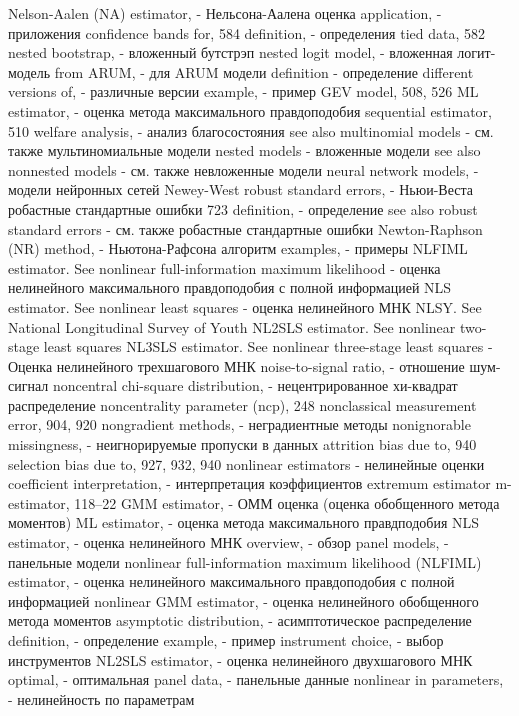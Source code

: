 Nelson-Aalen (NA) estimator, - Нельсона-Аалена оценка
application, - приложения
confidence bands for, 584 
definition, - определения
tied data, 582
nested bootstrap, - вложенный бутстрэп
nested logit model, - вложенная логит-модель
from ARUM, - для ARUM модели
definition - определение
different versions of, - различные версии 
example, - пример
GEV model, 508, 526 
ML estimator, - оценка метода максимального правдоподобия
sequential estimator, 510 
welfare analysis, - анализ благосостояния
see also multinomial models  - см. также мультиномиальные модели
nested models - вложенные модели
see also nonnested models - см. также невложенные модели
neural network models, - модели нейронных сетей
Newey-West robust standard errors, - Ньюи-Веста робастные стандартные ошибки
723
definition, - определение
see also robust standard errors - см. также робастные стандартные ошибки
Newton-Raphson (NR) method, - Ньютона-Рафсона алгоритм
examples, - примеры
NLFIML estimator. See nonlinear full-information maximum likelihood - оценка нелинейного максимального правдоподобия с полной информацией
NLS estimator. See nonlinear least squares - оценка нелинейного МНК
NLSY. See National Longitudinal Survey of Youth NL2SLS estimator. See nonlinear two-stage least
squares
NL3SLS estimator. See nonlinear three-stage least squares - Оценка нелинейного трехшагового МНК
noise-to-signal ratio, - отношение шум-сигнал
noncentral chi-square distribution, - нецентрированное хи-квадрат распределение
noncentrality parameter (ncp), 248 nonclassical measurement error, 904, 920 
nongradient methods, - неградиентные методы
nonignorable missingness, - неигнорируемые пропуски в данных
attrition bias due to, 940
selection bias due to, 927, 932, 940 
nonlinear estimators - нелинейные оценки
coefficient interpretation, - интерпретация коэффициентов
extremum estimator m-estimator, 118–22
GMM estimator, - ОММ оценка (оценка обобщенного метода моментов)
ML estimator, - оценка метода максимального правдподобия
NLS estimator, - оценка нелинейного МНК
overview, - обзор
panel models, - панельные модели
nonlinear full-information maximum likelihood (NLFIML) estimator, - оценка нелинейного максимального правдоподобия с полной информацией
nonlinear GMM estimator, - оценка нелинейного обобщенного метода моментов
asymptotic distribution, - асимптотическое распределение
definition, - определение
example, - пример 
instrument choice, - выбор инструментов 
NL2SLS estimator, - оценка нелинейного двухшагового МНК
optimal, - оптимальная
panel data, - панельные данные
nonlinear in parameters, - нелинейность по параметрам
